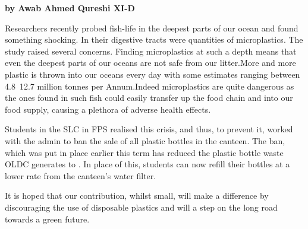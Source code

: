 \documentclass{article}
\date{\today}
\begin{document}
\maketitle
\large 



\textbf{by Awab Ahmed Qureshi XI-D}

Researchers recently probed fish-life in the deepest parts of our ocean and found something shocking. In their digestive tracts were quantities of microplastics. The study raised several concerns. Finding microplastics at such a depth means that even the deepest parts of our oceans are not safe from our litter.More and more plastic is thrown into our oceans every day with some estimates ranging between 4.8~12.7 million tonnes per Annum.\newline Indeed microplastics are quite dangerous as the ones found in such fish could easily transfer up the food chain and into our food supply, causing a plethora of adverse health effects.

Students in the SLC in FPS realised this crisis, and thus, to prevent it, worked with the admin to ban the sale of all plastic bottles in the canteen. The ban, which was put in place earlier this term has reduced the plastic bottle waste OLDC generates to . In place of this, students can now refill their bottles at a lower rate from the canteen's water filter.

It is hoped that our contribution, whilst small, will make a difference by discouraging the use of disposable plastics and will a step on the long road towards a green future. 


\closearticle
\end{document}
